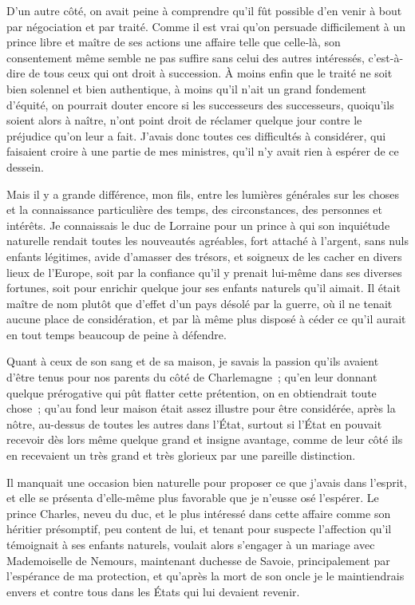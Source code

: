 \documentclass[french,twoside]{book} %
\begin{document}
D’un autre côté, on avait peine à comprendre qu’il fût possible d’en venir à bout par négociation et par traité. Comme il est vrai qu’on persuade difficilement à un prince libre et maître de ses actions une affaire telle que celle-là, son consentement même semble ne pas suffire sans celui des autres intéressés, c’est-à-dire de tous ceux qui ont droit à succession. À moins enfin que le traité ne soit bien solennel et bien authentique, à moins qu’il n’ait un grand fondement d’équité, on pourrait douter encore si les successeurs des successeurs, quoiqu’ils soient alors à naître, n’ont point droit de réclamer quelque jour contre le préjudice qu’on leur a fait. J’avais donc toutes ces difficultés à considérer, qui faisaient croire à une partie de mes ministres, qu’il n’y avait rien à espérer de ce dessein.\par
Mais il y a grande différence, mon fils, entre les lumières générales sur les choses et la connaissance particulière des temps, des circonstances, des personnes et intérêts. Je connaissais le duc de Lorraine pour un prince à qui son inquiétude naturelle rendait toutes les nouveautés agréables, fort attaché à l’argent, sans nuls enfants légitimes, avide d’amasser des trésors, et soigneux de les cacher en divers lieux de l’Europe, soit par la confiance qu’il y prenait lui-même dans ses diverses fortunes, soit pour enrichir quelque jour ses enfants naturels qu’il aimait. Il était maître de nom plutôt que d’effet d’un pays désolé par la guerre, où il ne tenait aucune place de considération, et par là même plus disposé à céder ce qu’il aurait en tout temps beaucoup de peine à défendre.\par
Quant à ceux de son sang et de sa maison, je savais la passion qu’ils avaient d’être tenus pour nos parents du côté de Charlemagne ; qu’en leur donnant quelque prérogative qui pût flatter cette prétention, on en obtiendrait toute chose ; qu’au fond leur maison était assez illustre pour être considérée, après la nôtre, au-dessus de toutes les autres dans l’État, surtout si l’État en pouvait recevoir dès lors même quelque grand et insigne avantage, comme de leur côté ils en recevaient un très grand et très glorieux par une pareille distinction.\par
Il manquait une occasion bien naturelle pour proposer ce que j’avais dans l’esprit, et elle se présenta d’elle-même plus favorable que je n’eusse osé l’espérer. Le prince Charles, neveu du duc, et le plus intéressé dans cette affaire comme son héritier présomptif, peu content de lui, et tenant pour suspecte l’affection qu’il témoignait à ses enfants naturels, voulait alors s’engager à un mariage avec Mademoiselle de Nemours, maintenant duchesse de Savoie, principalement par l’espérance de ma protection, et qu’après la mort de son oncle je le maintiendrais envers et contre tous dans les États qui lui devaient revenir.\par
\end{document}
